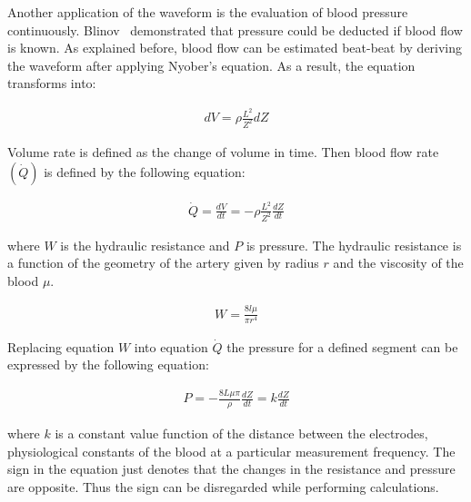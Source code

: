 Another application of the waveform is the evaluation of blood pressure continuously. Blinov~\cite{blinov1997plethysmographic} demonstrated that pressure could be deducted if blood flow is known. As explained before, blood flow can be estimated beat-beat by deriving the waveform after applying Nyober's equation. As a result, the equation transforms into:

\begin{align}
\label{eq:dvdr}
dV = \rho \frac{L^2}{Z^2} dZ
\end{align}

Volume rate is defined as the change of volume in time. Then blood flow rate $(\dot{Q})$ is defined by the following equation:

\begin{align}
\label{eq:Q}
\dot{Q} = \frac{dV}{dt}=-\rho \frac{L^2}{Z^{2}} \frac{dZ}{dt}
\end{align}

where $W$ is the hydraulic resistance and $P$ is pressure. The hydraulic resistance is a function of the geometry of the artery given by radius $r$ and the viscosity of the blood $\mu$.

\begin{align}
W=\frac{8 l \mu}{\pi r^4}
\end{align}

Replacing equation $W$ into equation $\dot{Q}$ the pressure for a defined segment can be expressed by the following equation:

\begin{align}
P = -\frac{8 L \mu \pi}{\rho} \frac{dZ}{dt} = k \frac{dZ}{dt}
\end{align}

where $k$ is a constant value function of the distance between the electrodes, physiological constants of the blood at a particular measurement frequency. The sign in the equation just denotes that the changes in the resistance and pressure are opposite. Thus the sign can be disregarded while performing calculations.

